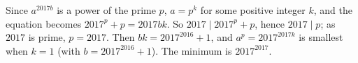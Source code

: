 Since $a^{2017b}$ is a power of the prime $p$, $a=p^k$ for some positive integer $k$, and the equation becomes $2017^p+p=2017bk$. So $2017\mid2017^p+p$, hence $2017\mid p$; as $2017$ is prime, $p=2017$. Then $bk=2017^{2016}+1$, and $a^p=2017^{2017k}$ is smallest when $k=1$ (with $b=2017^{2016}+1$). The minimum is $\boxed{2017^{2017}}$.
